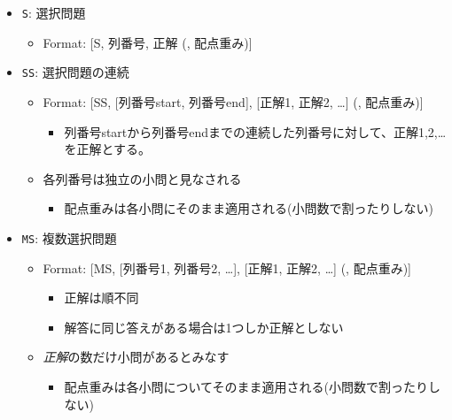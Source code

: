 \begin{itemize}
\item \texttt{S}: 選択問題

\begin{itemize}
\item Format: {[S, 列番号, 正解 (, 配点重み)]}

\end{itemize}

\item \texttt{SS}: 選択問題の連続

\begin{itemize}
\item Format: {[SS, {[列番号start, 列番号end]}, {[正解1, 正解2, {\ldots}]} (, 配点重み)]}

\begin{itemize}
\item 列番号startから列番号endまでの連続した列番号に対して、正解1,2,{\ldots}を正解とする。

\end{itemize}

\item 各列番号は独立の小問と見なされる

\begin{itemize}
\item 配点重みは各小問にそのまま適用される(小問数で割ったりしない)

\end{itemize}

\end{itemize}

\item \texttt{MS}: 複数選択問題

\begin{itemize}
\item Format: {[MS, {[列番号1, 列番号2, {\ldots}]}, {[正解1, 正解2, {\ldots}]} (, 配点重み)]}

\begin{itemize}
\item 正解は順不同

\item 解答に同じ答えがある場合は1つしか正解としない

\end{itemize}

\item \emph{正解}の数だけ小問があるとみなす

\begin{itemize}
\item 配点重みは各小問についてそのまま適用される(小問数で割ったりしない)


\end{itemize}
\end{itemize}
\end{itemize}
